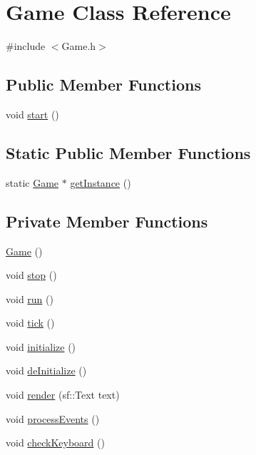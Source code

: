 \hypertarget{class_game}{\section{Game Class Reference}
\label{class_game}
}


{\ttfamily \#include $<$Game.\-h$>$}

\subsection*{Public Member Functions}
\begin{DoxyCompactItemize}
\item 
void \hyperlink{class_game_a3d9b98f7c4a96ecf578f75b96c9f0e90}{start} ()
\end{DoxyCompactItemize}
\subsection*{Static Public Member Functions}
\begin{DoxyCompactItemize}
\item 
static \hyperlink{class_game}{Game} $\ast$ \hyperlink{class_game_a19798a4f4c50037e1c5cd8c5d491fef9}{get\-Instance} ()
\end{DoxyCompactItemize}
\subsection*{Private Member Functions}
\begin{DoxyCompactItemize}
\item 
\hyperlink{class_game_ad59df6562a58a614fda24622d3715b65}{Game} ()
\item 
void \hyperlink{class_game_a17fbb36fd4a2085f9ff4f1fa93d7d08b}{stop} ()
\item 
void \hyperlink{class_game_a1ab78f5ed0d5ea879157357cf2fb2afa}{run} ()
\item 
void \hyperlink{class_game_adf1634a2d0c22f30f7c57e72fd2831bc}{tick} ()
\item 
void \hyperlink{class_game_a14073b7ee15e3a60b72112519be85453}{initialize} ()
\item 
void \hyperlink{class_game_ad84d0640aa525f9176114b81ed49228f}{de\-Initialize} ()
\item 
void \hyperlink{class_game_aa3fec20434abdc6d400a05662a0a5472}{render} (sf\-::\-Text text)
\item 
void \hyperlink{class_game_a79f698dda206dd7a9bed28b3f88bdc38}{process\-Events} ()
\item 
void \hyperlink{class_game_ae7c76d04cd372001e3923611d5832eac}{check\-Keyboard} ()
\end{DoxyCompactItemize}
